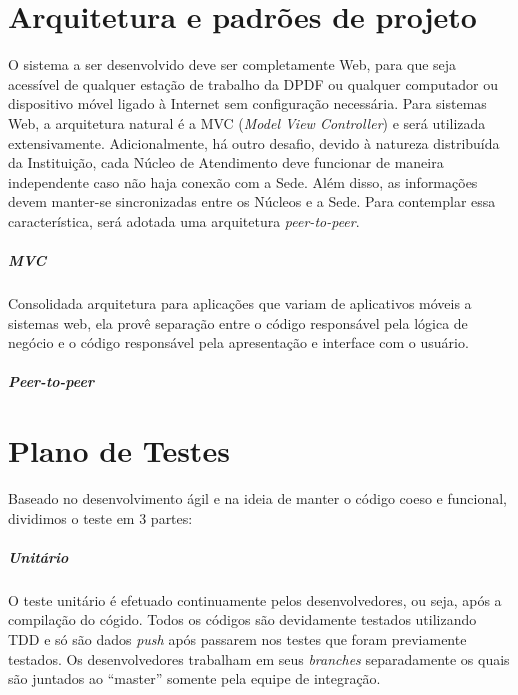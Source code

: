 \documentclass[12pt,a4paper]{report}
\begin{document}
\chapter{Arquitetura e padrões de projeto}

O sistema a ser desenvolvido deve ser completamente Web, para que seja acessível de qualquer estação de trabalho da DPDF ou qualquer computador ou dispositivo móvel ligado à Internet sem configuração necessária. Para sistemas Web, a arquitetura natural é a MVC (\textit{Model View Controller}) e será utilizada extensivamente. Adicionalmente, há outro desafio, devido à natureza distribuída da Instituição, cada Núcleo de Atendimento deve funcionar de maneira independente caso não haja conexão com a Sede. Além disso, as informações devem manter-se sincronizadas entre os Núcleos e a Sede. Para contemplar essa característica, será adotada uma arquitetura \textit{peer-to-peer}.

\paragraph{MVC} Consolidada arquitetura para aplicações que variam de aplicativos móveis a sistemas web, ela provê separação entre o código responsável pela lógica de negócio e o código responsável pela apresentação e interface com o usuário.

\paragraph{\textit{Peer-to-peer}} 


\chapter{Plano de Testes}
Baseado no desenvolvimento ágil e na ideia de manter o código coeso e funcional, dividimos o teste em 3 partes:

\paragraph{Unitário} O teste unitário é efetuado continuamente pelos desenvolvedores, ou seja, após a compilação do cógido. Todos os códigos são devidamente testados utilizando TDD e só são dados \textit{push} após passarem nos testes que foram previamente testados. Os desenvolvedores trabalham em seus \textit{branches} separadamente os quais são juntados ao ``master'' somente pela equipe de integração.
\end{document}
